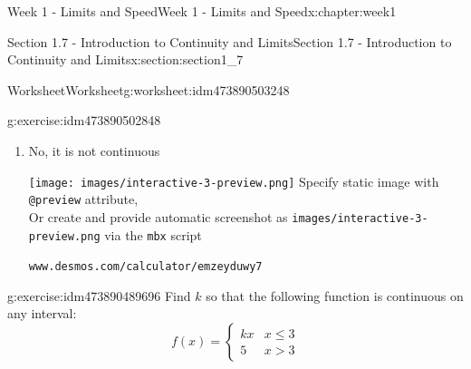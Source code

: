 \documentclass[oneside,10pt,]{book}
\newcommand{\mono}[1]{\texttt{#1}}
\numberwithin{equation}{section}
\newlength{\qrsize}
\newlength{\previewwidth}
\begin{document}
\begin{chapterptx}{Week 1 - Limits and Speed}{}{Week 1 - Limits and Speed}{}{}{x:chapter:week1}
\begin{sectionptx}{Section 1.7 - Introduction to Continuity and Limits}{}{Section 1.7 - Introduction to Continuity and Limits}{}{}{x:section:section1_7}
\begin{worksheet-subsection}{Worksheet}{}{Worksheet}{}{}{g:worksheet:idm473890503248}
\begin{divisionexercise}{1}{}{}{g:exercise:idm473890502848}
\begin{enumerate}[label=(\alph*)]
\begin{tcbraster}[raster columns=2, raster column skip=1pt, raster halign=center, raster force size=false, raster left skip=0pt, raster right skip=0pt]
\begin{tcolorbox}[previewstyle, width=\previewwidth]
\end{tcolorbox}%
\begin{tcolorbox}[qrstyle]%
{\hypersetup{urlcolor=black}}%
\end{tcolorbox}%
\begin{tcolorbox}[captionstyle]%
\small \mono{www.desmos.com/calculator/kslwpjxdgf}\end{tcolorbox}%
\end{tcbraster}%
%
\item{}No, it is not continuous%
\par
\setlength{\qrsize}{9em}
\setlength{\previewwidth}{\linewidth}
\addtolength{\previewwidth}{-\qrsize}
\begin{tcbraster}[raster columns=2, raster column skip=1pt, raster halign=center, raster force size=false, raster left skip=0pt, raster right skip=0pt]%
\begin{tcolorbox}[previewstyle, width=\previewwidth]%
%
{\texttt{[image: images/interactive-3-preview.png]}}%
{\small{}Specify static image with \mono{@preview} attribute,\\Or create and provide automatic screenshot as \mono{images/interactive-3-preview.png} via the \mono{mbx} script}%
\end{tcolorbox}%
\begin{tcolorbox}[qrstyle]%
{\hypersetup{urlcolor=black}}%
\end{tcolorbox}%
\begin{tcolorbox}[captionstyle]%
\small \mono{www.desmos.com/calculator/emzeyduwy7}\end{tcolorbox}%
\end{tcbraster}%
%
\end{enumerate}
\end{divisionexercise}%
\begin{divisionexercise}{2}{}{}{g:exercise:idm473890489696}%
Find \(k\) so that the following function is continuous on any interval:%
\begin{equation*}
f(x) = \left \{ \begin{matrix} kx & x \leq 3 \\ 5 & x > 3 \end{matrix} \right. 
\end{equation*}
%
\par
\setlength{\qrsize}{9em}
\setlength{\previewwidth}{\linewidth}
\addtolength{\previewwidth}{-\qrsize}

\end{divisionexercise}
\end{worksheet-subsection}
\end{sectionptx}
\end{chapterptx}
\end{document}
